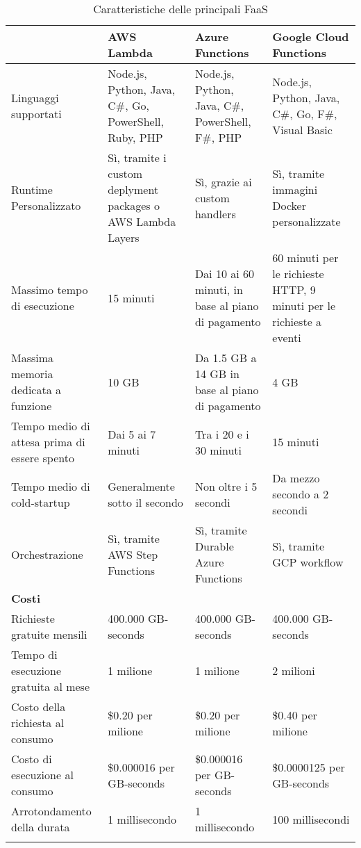 \begin{longtable} {|P{3.5cm}|P{3.7cm}|P{3.7cm}|P{3.7cm}|}
        \hline
        & \textbf{AWS Lambda}& \textbf{Azure Functions} & \textbf{Google Cloud Functions}                                                  \\
        \hline
        \endhead
        Linguaggi supportati &
        Node.js, Python, Java, C\#, Go, PowerShell, Ruby, PHP
        &
        Node.js, Python, Java, C\#, PowerShell, F\#, PHP
        &
        Node.js, Python, Java, C\#, Go, F\#, Visual Basic\\
        \hline
        Runtime Personalizzato & Sì, tramite i custom deplyment packages o AWS Lambda Layers& 
        Sì, grazie ai custom handlers &
        Sì, tramite immagini Docker personalizzate\\
        \hline
        Massimo tempo di esecuzione &
        15 minuti & 
        Dai 10 ai 60 minuti, in base al piano di pagamento
        &
        60 minuti per le richieste HTTP, 9 minuti per le richieste a eventi\\
        \hline
        Massima memoria dedicata a funzione &
        10 GB &
        Da 1.5 GB a 14 GB in base al piano di pagamento&
        4 GB\\
        \hline
        Tempo medio di attesa prima di essere spento &
        Dai 5 ai 7 minuti&
        Tra i 20 e i 30 minuti&
        15 minuti\\ 
        \hline
        Tempo medio di cold-startup &
        Generalmente sotto il secondo&
        Non oltre i 5 secondi&
        Da mezzo secondo a 2 secondi\\ 
        \hline
        Orchestrazione &
        Sì, tramite AWS Step Functions&
        Sì, tramite Durable Azure Functions&
        Sì, tramite GCP workflow\\ 
        \hline
            \textbf{Costi}      &&&\\
        \hline
        Richieste gratuite mensili&
        400.000 GB-seconds &
        400.000 GB-seconds&
        400.000 GB-seconds\\
        \hline
        Tempo di esecuzione gratuita al mese& 
        1 milione&
        1 milione&
        2 milioni\\
        \hline
        Costo della richiesta al consumo &
        \$0.20 per milione&
        \$0.20 per milione        &
        \$0.40 per milione\\
        \hline
        Costo di esecuzione al consumo &
        \$0.000016 per GB-seconds&
        \$0.000016 per GB-seconds&
        \$0.0000125 per GB-seconds\\
        \hline
        Arrotondamento della durata &
        1 millisecondo &
        1 millisecondo &
        100 millisecondi\\
        \hline
    \caption{Caratteristiche delle principali FaaS}
\end{longtable}

